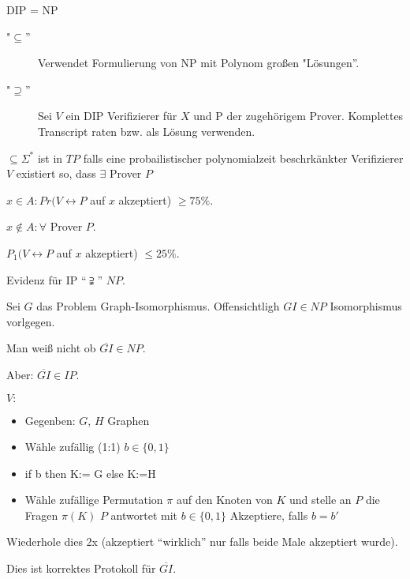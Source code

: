\begin{satz}
DIP = NP

\begin{description}
\item["$\subseteq$''] Verwendet Formulierung von NP mit Polynom großen "Lösungen''.
\item["$\supseteq$''] Sei $V$ ein DIP Verifizierer für $X$ und P der
  zugehörigem Prover. Komplettes Transcript raten bzw. als Lösung
  verwenden.
\end{description}
\end{satz}

\begin{definition}
$ \subseteq \Sigma^*$ ist in $TP$
falls eine probailistischer polynomialzeit beschrkänkter Verifizierer $V$
existiert so, dass $\exists$ Prover $P$

$ x\in A : Pr(V \leftrightarrow P$ auf $x$ akzeptiert) $\geq 75\%$.

$ x \notin A : \forall$ Prover $P$.

$P_1 (V \leftrightarrow P$ auf $x$ akzeptiert) $\leq 25\%$.

Evidenz für IP ``$\supsetneqq$'' $NP$.

Sei $G$ das Problem Graph-Isomorphismus. Offensichtligh $GI \in NP$ Isomorphismus vorlgegen.

Man weiß nicht ob $\overline{GI} \in NP$.

Aber: $\overline{GI} \in IP$.

$V:$

\begin{itemize}
\item Gegenben: $G$,  $H$ Graphen
\item Wähle zufällig (1:1) $b\in \{0,1\}$
\item if b then K:= G else K:=H
\item Wähle zufällige Permutation $\pi$ auf den Knoten von $K$ und stelle an $P$ die Fragen $\pi(K)$ $P$ antwortet mit $b\in \{0,1\}$
Akzeptiere, falls $b=b'$
\end{itemize}

Wiederhole dies 2x (akzeptiert ``wirklich'' nur falls beide Male akzeptiert wurde).

Dies ist korrektes Protokoll für $\overline{GI}$.

\end{definition}









